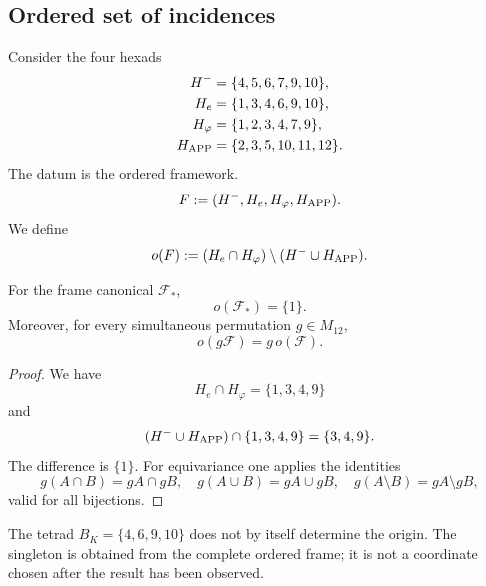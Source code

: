 \subsection{Ordered set of incidences}

Consider the four hexads
\begin{align}
 H^-&=\{4,5,6,7,9,10\},
 \label{p12-83-c20-s5:eq:hexada-marco-negativa}\\
 H_e&=\{1,3,4,6,9,10\},
 \label{p12-83-c20-s5:eq:hexada-marco-e}\\
 H_\varphi&=\{1,2,3,4,7,9\},
 \label{p12-83-c20-s5:eq:hexada-marco-phi}\\
 H_{\rm APP}&=\{2,3,5,10,11,12\}.
 \label{p12-83-c20-s5:eq:hexada-marco-app}
\end{align}
The datum is the ordered framework.
\begin{equation}
 \mathcal F:=(H^-,H_e,H_\varphi,H_{\rm APP}).
 \label{p12-83-c20-s5:eq:marco-incidencial-ordenado}
\end{equation}
We define
\begin{equation}
 o(\mathcal F)
 :=(H_e\cap H_\varphi)\setminus(H^-\cup H_{\rm APP}).
 \label{p12-83-c20-s5:eq:operador-origen-incidencial}
\end{equation}

\begin{theorem}
\label{p12-83-c20-s5:thm:origen-incidencial-equivariante}
For the frame canonical \(\mathcal F_*\),
\begin{equation}
 \boxed{o(\mathcal F_*)=\{1\}.}
 \label{p12-83-c20-s5:eq:origen-incidencial-singleton}
\end{equation}
Moreover, for every simultaneous permutation \(g\in M_{12}\),
\begin{equation}
 o(g\mathcal F)=g\,o(\mathcal F).
 \label{p12-83-c20-s5:eq:equivarianza-origen-incidencial}
\end{equation}
\end{theorem}

\begin{proof}
We have
\[
 H_e\cap H_\varphi=\{1,3,4,9\}
\]
and
\[
 (H^-\cup H_{\rm APP})\cap\{1,3,4,9\}=\{3,4,9\}.
\]
The difference is \(\{1\}\). For equivariance one applies the
identities
\[
 g(A\cap B)=gA\cap gB,
 \quad
 g(A\cup B)=gA\cup gB,
 \quad
 g(A\setminus B)=gA\setminus gB,
\]
valid for all bijections.
\end{proof}

The tetrad \(B_K=\{4,6,9,10\}\) does not by itself determine the origin. The
singleton is obtained from the complete ordered frame; it is not a
coordinate chosen after the result has been observed.

